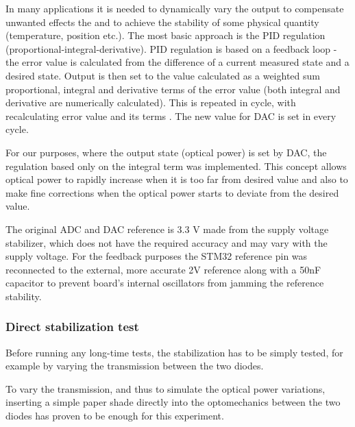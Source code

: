 \par
In many applications it is needed to dynamically vary the output to compensate unwanted effects the and to achieve the stability of some physical quantity (temperature, position etc.). The most basic approach is the PID regulation (proportional-integral-derivative). PID regulation is based on a feedback loop - the error value is calculated from the difference of a current measured state and a desired state. Output is then set to the value calculated as a weighted sum proportional, integral and derivative terms of the error value (both integral and derivative are numerically calculated). This is repeated in cycle, with recalculating error value and its terms \cite{PID}. The new value for DAC is set in every cycle.

\par
For our purposes, where the output state (optical power) is set by DAC, the regulation based only on the integral term was implemented. This concept allows optical power to rapidly increase when it is too far from desired value and also to make fine corrections when the optical power starts to deviate from the desired value. 

\par

The original ADC and DAC reference is 3.3 V made from the supply voltage stabilizer, which does not have the required accuracy and may vary with the supply voltage. For the feedback purposes the STM32 reference pin was reconnected to the external, more accurate 2V reference along with a 50nF capacitor to prevent board's internal oscillators from jamming the reference stability.     




\subsubsection{Direct stabilization test}

Before running any long-time tests, the stabilization has to be simply tested, for example by varying the transmission between the two diodes.
\par
To vary the transmission, and thus to simulate the optical power variations, inserting a simple paper shade directly into the optomechanics between the two diodes has proven to be enough for this experiment.

